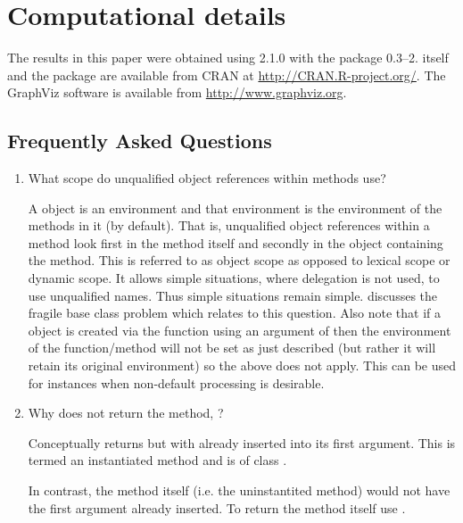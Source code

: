 \documentclass{Z}
\begin{document}
\section*{Computational details}
\label{sec:compute}

The results in this paper were obtained using  2.1.0 with
the package  0.3--2.  itself and the
 package are available from CRAN at
\url{http://CRAN.R-project.org/}.  The GraphViz software is available
from \url{http://www.graphviz.org}.

{}

%

\newpage\mbox{}
\begin{appendix}
\section{Frequently Asked Questions}
\label{sec:faq}
\begin{enumerate}
\item{What scope do unqualified object references within methods use?

A  object is an environment and that environment
is the environment
of the methods in it (by default).
That is, unqualified object references
within a  method look first in the method itself and secondly in the
 object containing the method.
This is referred to as object
scope as opposed to lexical scope or dynamic scope.  It allows simple 
situations, where delegation is not used, to use unqualified names.  Thus 
simple situations remain simple.  
\citep{Kates2004}
discusses the fragile base class problem which 
relates to this question. Also note that if a  object is created
via the  function using an argument of 
then the environment of the function/method will not be set as just
described (but rather it will retain its original environment) so the
above does not apply.  This can be used for instances when non-default
processing is desirable.}
\item{Why does  not return the method, ?  

Conceptually  returns  but with 
 already inserted into its first argument.
This is termed an instantiated
method and is of  class .

In contrast, the method itself (i.e. the uninstantited method)
would not have the first argument already
inserted.  To return the method itself use .

}
\end{enumerate}
\end{appendix}
\end{document}
